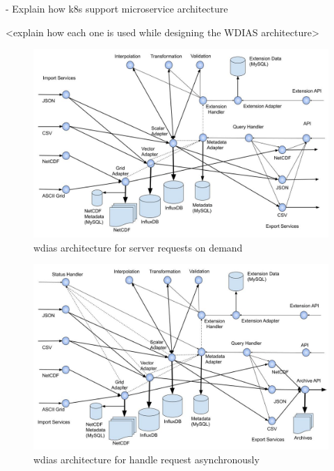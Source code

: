 - Explain how k8s support microservice architecture

<explain how each one is used while designing the WDIAS architecture>

\begin{figure}[htp]
    \centering
    \includegraphics[width=1\textwidth]{method/microservice/microservice_architecture-handle_on_demand-v3.jpg}
    \caption{\acrshort{wdias} architecture for server requests on demand}
    \label{fi:wdias_micro_on_demand}
\end{figure}

\begin{figure}[htp]
    \centering
    \includegraphics[width=1\textwidth]{method/microservice/microservice_architecture-handle_on_async-v3.jpg}
    \caption{\acrshort{wdias} architecture for handle request asynchronously}
    \label{fi:wdias_micro_async}
\end{figure}

